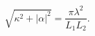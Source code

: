\begin{equation}\label{adhm}
\sqrt{\kappa^2+|\alpha|^2}=\frac{\pi \lambda^2}{L_1 L_2}.
\end{equation}

